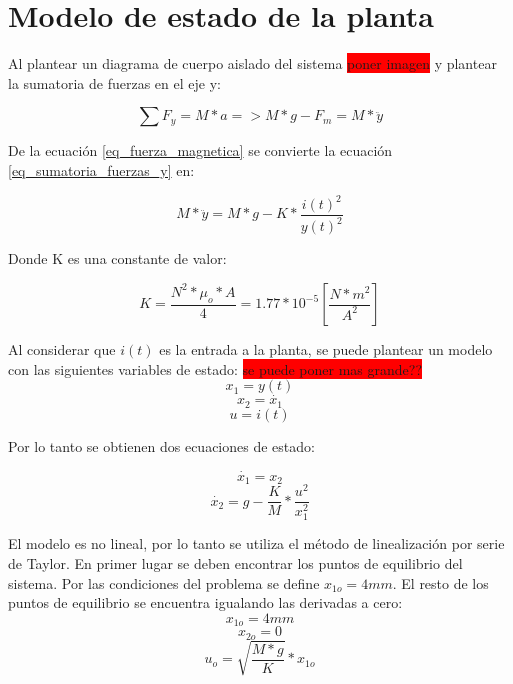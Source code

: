 \section{Modelo de estado de la planta}

\noindent Al plantear un diagrama de cuerpo aislado del sistema \colorbox{red}{poner imagen} y plantear la sumatoria de fuerzas en el eje y:

\begin{equation}\label{eq_sumatoria_fuerzas_y}
	\sum F_{y}=M*a=>M*g-F_{m}=M*\ddot{y}
\end{equation}

\noindent De la ecuación \ref{eq_fuerza_magnetica} se convierte la ecuación \ref{eq_sumatoria_fuerzas_y} en:

\begin{equation}\label{eq_sumatoria_fuerzas_y_2}
	M*\ddot{y}=M*g-K*\frac{i(t)^{2}}{y(t)^{2}}
\end{equation}

\noindent Donde K es una constante de valor:

\begin{equation}
	K=\frac{N^{2}*\mu_{o}*A}{4}=1.77*10^{-5} [\frac{N*m^2}{A^2}]
\end{equation}

\noindent Al considerar que $i(t)$ es la entrada a la planta, se puede plantear un modelo con las siguientes variables de estado:\newline
\colorbox{red}{se puede poner mas grande??}
\begin{equation}
	x_{1}=y(t)
\end{equation}
\begin{equation}
	x_{2}=\dot{x_{1}}
\end{equation}
\begin{equation}
	u=i(t)
\end{equation}

\noindent Por lo tanto se obtienen dos ecuaciones de estado:

\begin{equation}
	\dot{x_{1}}=x_{2}
\end{equation}
\begin{equation}
	\dot{x_{2}}=g-\frac{K}{M}*\frac{u^{2}}{x_{1}^{2}}
\end{equation}

\noindent El modelo es no lineal, por lo tanto se utiliza el método de linealización por serie de Taylor. En primer lugar se deben encontrar los puntos de equilibrio del sistema. Por las condiciones del problema se define $x_{1o}=4mm$. El resto de los puntos de equilibrio se encuentra igualando las derivadas a cero:
\begin{equation}
	x_{1o}=4mm
\end{equation}
\begin{equation}
	x_{2o}=0
\end{equation}
\begin{equation}
	u_{o}=\sqrt{\frac{M*g}{K}}*x_{1o}
\end{equation}

